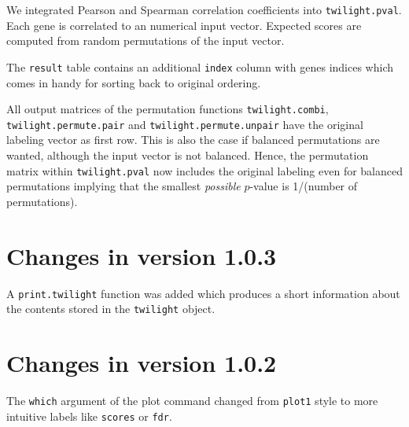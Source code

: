 \documentclass[11pt,a4paper,fleqn]{article}
\newcommand{\Robject}[1]{{\texttt{#1}}}
\newcommand{\Rfunction}[1]{{\texttt{#1}}}
\newcommand{\Rfunarg}[1]{{\texttt{#1}}}
\begin{document}
We integrated Pearson and Spearman correlation coefficients into \Rfunction{twilight.pval}. Each gene is correlated to an numerical input vector. Expected scores are computed from random permutations of the input vector.

The \Robject{result} table contains an additional \Robject{index} column with genes indices which comes in handy for sorting back to original ordering.

All output matrices of the permutation functions \Rfunction{twilight.combi}, \Rfunction{twilight.permute.pair} and \Rfunction{twilight.permute.unpair} have the original labeling vector as first row. This is also the case if balanced permutations are wanted, although the input vector is not balanced. Hence, the permutation matrix within \Rfunction{twilight.pval} now includes the original labeling even for balanced permutations implying that the smallest \textit{possible} $p$-value is 1/(number of permutations).


\section{Changes in version 1.0.3}

A \Rfunction{print.twilight} function was added which produces a short information about the contents stored in the \Robject{twilight} object.


\section{Changes in version 1.0.2}

The \Rfunarg{which} argument of the plot command changed from \Rfunction{plot1} style to more intuitive labels like \Rfunarg{scores} or \Rfunarg{fdr}.
\end{document}

